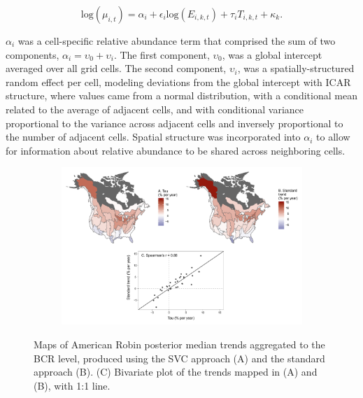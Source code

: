 \documentclass[]{article}
\begin{document}
$$\text{log}(\mu_{i,t}) = \alpha _{i} + \epsilon_{i} \text{log}(E_{i,k,t}) + \tau_{i}T_{i,k,t} + \kappa_{k}.$$

$\alpha_i$ was a cell-specific relative abundance term that comprised the sum of two components, $\alpha_i = \upsilon_0 + \upsilon_i$. The first component, $\upsilon_0$, was a global intercept averaged over all grid cells. The second component, $\upsilon_i$, was a spatially-structured random effect per cell, modeling deviations from the global intercept with ICAR structure, where values came from a normal distribution, with a conditional mean related to the average of adjacent cells, and with conditional variance proportional to the variance across adjacent cells and inversely proportional to the number of adjacent cells. Spatial structure was incorporated into $\alpha_i$ to allow for information about relative abundance to be shared across neighboring cells.

\begin{figure}[t]
  \centering
  \begin{subfigure}[t]{0.99\textwidth}
    \centering
    \includegraphics[width=\textwidth]{tau_bcr} 
  \end{subfigure}
  \caption{Maps of American Robin posterior median trends aggregated to the BCR level, produced using the SVC approach (A) and the standard approach (B). (C) Bivariate plot of the trends mapped in (A) and (B), with 1:1 line.}
\end{figure}
\end{document}
